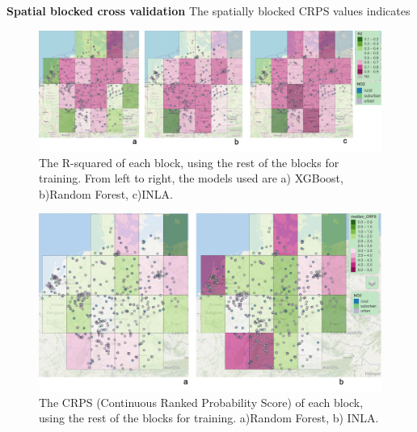 \documentclass{article}
\begin{document}
\textbf{Spatial blocked cross validation }
The spatially blocked CRPS values indicates 



\begin{figure}
    \centering
    \includegraphics[scale=0.4]{fig/r2spcv.png}
    \caption{The R-squared of each block, using the rest of the blocks for training. From left to right, the models used are a) XGBoost, b)Random Forest, c)INLA. 
}
    \label{fig:r2}
\end{figure}

\begin{figure}
    \centering
    \includegraphics[scale=0.3]{fig/crps_RF_INLA.png}
    \caption{The CRPS (Continuous Ranked Probability Score) of each block, using the rest of the blocks for training. a)Random Forest, b) INLA. 
}
    \label{fig:r2}
\end{figure}
\end{document}
